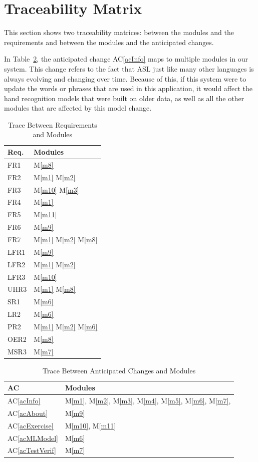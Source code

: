 \documentclass[12pt, titlepage]{article}
\newcommand{\acref}[1]{AC\ref{#1}}
\newcommand{\mref}[1]{M\ref{#1}}
\begin{document}
\section{Traceability Matrix} \label{SecTM}

This section shows two traceability matrices: between the modules and the
requirements and between the modules and the anticipated changes. 

In Table~\ref{TblACT}, the anticipated change \acref{acInfo} maps to multiple modules in our system. This change refers to the fact that ASL just like
many other languages is always evolving and changing over time. Because of this, if this system were to update the words or phrases that are used in
this application, it would affect the hand recognition models that were built on older data, as well as all the other modules that are affected by this model change. 

\begin{table}[H]
\centering
\begin{tabular}{p{} p{}}
\toprule
\textbf{Req.} & \textbf{Modules}\\
\midrule
FR1 & \mref{m8}\\
FR2 & \mref{m1} \mref{m2}\\
FR3 & \mref{m10} \mref{m3}\\
FR4 & \mref{m1}\\
FR5 & \mref{m11}\\
FR6 & \mref{m9}\\
FR7 & \mref{m1} \mref{m2} \mref{m8}\\
LFR1 & \mref{m9}\\
LFR2 & \mref{m1} \mref{m2}\\
LFR3 & \mref{m10}\\
UHR3 & \mref{m1} \mref{m8}\\
SR1 & \mref{m6}\\
LR2 & \mref{m6}\\
PR2 & \mref{m1} \mref{m2} \mref{m6}\\
OER2 & \mref{m8}\\
MSR3 & \mref{m7}\\
\bottomrule
\end{tabular}
\caption{Trace Between Requirements and Modules}
\label{TblRT}
\end{table}

\begin{table}[H]
\centering
\begin{tabular}{p{} p{}}
\toprule
\textbf{AC} & \textbf{Modules}\\
\midrule
\acref{acInfo} & \mref{m1}, \mref{m2}, \mref{m3}, \mref{m4}, \mref{m5}, \mref{m6}, \mref{m7},\\
\acref{acAbout} & \mref{m9}\\
\acref{acExercise} & \mref{m10}, \mref{m11}\\
\acref{acMLModel} & \mref{m6}\\
\acref{acTestVerif} & \mref{m7}\\
\bottomrule
\end{tabular}
\caption{Trace Between Anticipated Changes and Modules}
\label{TblACT}
\end{table}
\end{document}
